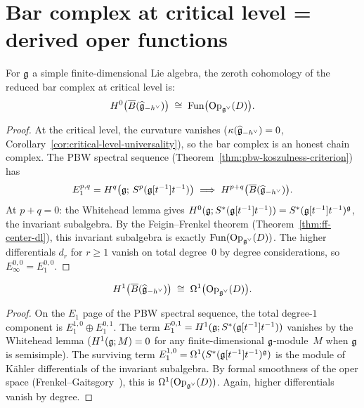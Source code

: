 \section{Bar complex at critical level = derived oper functions}
\label{sec:bar-critical}

\begin{theorem}[Zeroth bar cohomology = oper functions;
\ClaimStatusProvedHere]
\label{thm:oper-bar-h0-dl}
For $\mathfrak{g}$ a simple finite-dimensional Lie algebra, the zeroth
cohomology of the reduced bar complex at critical level is:
\begin{equation}\label{eq:h0-oper}
H^0\bigl(\overline{B}(\widehat{\mathfrak{g}}_{-h^\vee})\bigr)
\;\cong\;
\mathrm{Fun}\bigl(\mathrm{Op}_{\mathfrak{g}^\vee}(D)\bigr).
\end{equation}
\end{theorem}

\begin{proof}
At the critical level, the curvature vanishes
($\kappa(\widehat{\mathfrak{g}}_{-h^\vee}) = 0$,
Corollary~\ref{cor:critical-level-universality}), so the bar
complex is an honest chain complex.
The PBW spectral sequence
(Theorem~\ref{thm:pbw-koszulness-criterion}) has
\[
E_1^{p,q}
= H^q\bigl(\mathfrak{g};\, S^p(\mathfrak{g}[t^{-1}]t^{-1})\bigr)
\;\Longrightarrow\;
H^{p+q}\bigl(\overline{B}(\widehat{\mathfrak{g}}_{-h^\vee})\bigr).
\]
At $p + q = 0$: the Whitehead lemma gives
$H^0(\mathfrak{g}; S^*(\mathfrak{g}[t^{-1}]t^{-1})) = S^*(\mathfrak{g}[t^{-1}]t^{-1})^{\mathfrak{g}}$,
the invariant subalgebra.  By the Feigin--Frenkel theorem
(Theorem~\ref{thm:ff-center-dl}), this invariant subalgebra is exactly
$\mathrm{Fun}(\mathrm{Op}_{\mathfrak{g}^\vee}(D))$.  The higher
differentials $d_r$ for $r \geq 1$ vanish on total degree~$0$
by degree considerations, so $E_\infty^{0,0} = E_1^{0,0}$.
\end{proof}

\begin{proposition}
\label{prop:oper-bar-h1-dl}
\begin{equation}\label{eq:h1-oper}
H^1\bigl(\overline{B}(\widehat{\mathfrak{g}}_{-h^\vee})\bigr)
\;\cong\;
\Omega^1\bigl(\mathrm{Op}_{\mathfrak{g}^\vee}(D)\bigr).
\end{equation}
\end{proposition}

\begin{proof}
On the $E_1$ page of the PBW spectral sequence, the total degree-$1$
component is $E_1^{1,0} \oplus E_1^{0,1}$.  The term
$E_1^{0,1} = H^1(\mathfrak{g}; S^*(\mathfrak{g}[t^{-1}]t^{-1}))$ vanishes by the
Whitehead lemma ($H^1(\mathfrak{g}; M) = 0$ for any finite-dimensional
$\mathfrak{g}$-module~$M$ when $\mathfrak{g}$ is semisimple).  The surviving term
$E_1^{1,0} = \Omega^1(S^*(\mathfrak{g}[t^{-1}]t^{-1})^{\mathfrak{g}})$ is the module of
K\"ahler differentials of the invariant subalgebra.  By formal
smoothness of the oper space (Frenkel--Gaitsgory~\cite{FG06}),
this is $\Omega^1(\mathrm{Op}_{\mathfrak{g}^\vee}(D))$.  Again, higher
differentials vanish by degree.
\end{proof}

